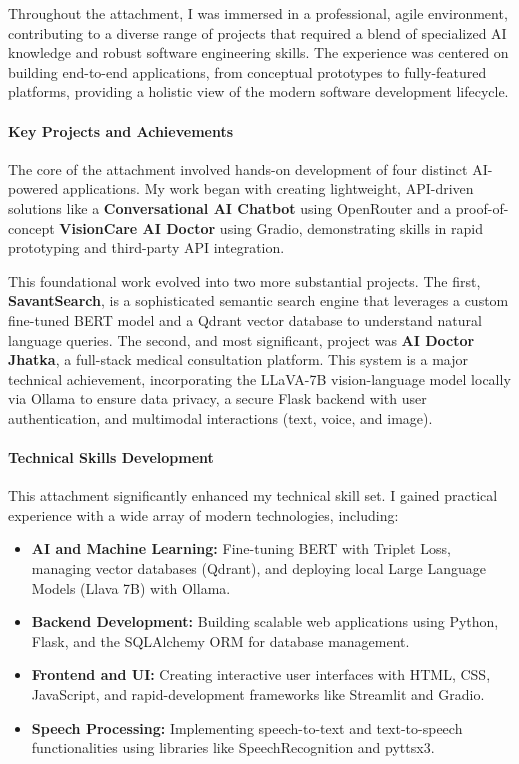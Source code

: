 \documentclass[12pt,a4paper]{article}
\begin{document}
Throughout the attachment, I was immersed in a professional, agile environment, contributing to a diverse range of projects that required a blend of specialized AI knowledge and robust software engineering skills. The experience was centered on building end-to-end applications, from conceptual prototypes to fully-featured platforms, providing a holistic view of the modern software development lifecycle.

\paragraph{Key Projects and Achievements} The core of the attachment involved hands-on development of four distinct AI-powered applications. My work began with creating lightweight, API-driven solutions like a \textbf{Conversational AI Chatbot} using OpenRouter and a proof-of-concept \textbf{VisionCare AI Doctor} using Gradio, demonstrating skills in rapid prototyping and third-party API integration.

This foundational work evolved into two more substantial projects. The first, \textbf{SavantSearch}, is a sophisticated semantic search engine that leverages a custom fine-tuned BERT model and a Qdrant vector database to understand natural language queries. The second, and most significant, project was \textbf{AI Doctor Jhatka}, a full-stack medical consultation platform. This system is a major technical achievement, incorporating the LLaVA-7B vision-language model locally via Ollama to ensure data privacy, a secure Flask backend with user authentication, and multimodal interactions (text, voice, and image).

\paragraph{Technical Skills Development} This attachment significantly enhanced my technical skill set. I gained practical experience with a wide array of modern technologies, including:
\begin{itemize}
    \item \textbf{AI and Machine Learning:} Fine-tuning BERT with Triplet Loss, managing vector databases (Qdrant), and deploying local Large Language Models (Llava 7B) with Ollama.
    \item \textbf{Backend Development:} Building scalable web applications using Python, Flask, and the SQLAlchemy ORM for database management.
    \item \textbf{Frontend and UI:} Creating interactive user interfaces with HTML, CSS, JavaScript, and rapid-development frameworks like Streamlit and Gradio.
    \item \textbf{Speech Processing:} Implementing speech-to-text and text-to-speech functionalities using libraries like SpeechRecognition and pyttsx3.
\end{itemize}
\end{document}
